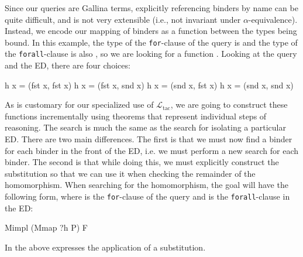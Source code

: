 \documentclass[preprint]{sigplanconf}
\newcommand{\ltac}[0]{\ensuremath{\mathcal{L}_{\mathrm{tac}}}}
\begin{document}
Since our queries are Gallina terms, explicitly referencing binders by name can be quite difficult, and is not very extensible (i.e., not invariant under $\alpha$-equivalence).
Instead, we encode our mapping of binders as a function between the types being bound.
In this example, the type of the {\tt for}-clause of the query is  and the type of the {\tt forall}-clause is also , so we are looking for a function .
Looking at the query and the ED, there are four choices:
\begin{coq}
h x = (fst x, fst x)
h x = (fst x, snd x)
h x = (snd x, fst x)
h x = (snd x, snd x)
\end{coq}

As is customary for our specialized use of \ltac, we are going to construct these functions incrementally using theorems that represent individual steps of reasoning.
The search is much the same as the search for isolating a particular ED.
There are two main differences.
The first is that we must now find a binder for each binder in the front of the ED, i.e. we must perform a new search for each binder.
The second is that while doing this, we must explicitly construct the substitution  so that we can use it when checking the remainder of the homomorphism.
When searching for the homomorphism, the goal will have the following form, where  is the {\tt for}-clause of the query and  is the {\tt forall}-clause in the ED:
\begin{coq}
Mimpl (Mmap ?h P) F
\end{coq}
In the above %
 expresses the application of a substitution.
\end{document}
